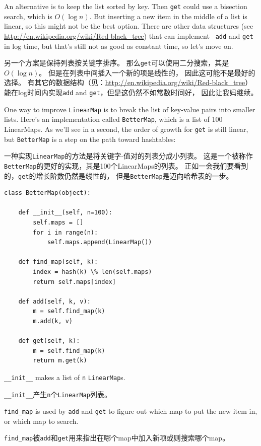 \documentclass[10pt]{book}
\begin{document}
\begin{CJK}{UTF8}{gbsn}
An alternative is to keep the list sorted by key.  Then {\tt get}
could use a bisection search, which is $O(\log n)$.  But inserting a
new item in the middle of a list is linear, so this might not be the
best option.  There are other data structures (see
  \url{http://en.wikipedia.org/wiki/Red-black_tree})  that can implement {\tt
  add} and {\tt get} in log time, but that's still not as good as
constant time, so let's move on.

另一个方案是保持列表按关键字排序。
那么{\tt get}可以使用二分搜索，其是$O(\log n)$。
但是在列表中间插入一个新的项是线性的，
因此这可能不是最好的选择。
有其它的数据结构（见：\url{http://en.wikipedia.org/wiki/Red-black_tree}）
能在log时间内实现{\tt add} and {\tt get}，但是这仍然不如常数时间好，
因此让我妈继续。

One way to improve {\tt LinearMap} is to break the list of key-value
pairs into smaller lists.  Here's an implementation called
{\tt BetterMap}, which is a list of 100 LinearMaps.  As we'll see
in a second, the order of growth for {\tt get} is still linear,
but {\tt BetterMap} is a step on the path toward hashtables:

一种实现{\tt LinearMap}的方法是将关键字-值对的列表分成小列表。
这是一个被称作{\tt BetterMap}的更好的实现，其是100个LinearMaps的列表。
正如一会我们要看到的，{\tt get}的增长阶数仍然是线性的，
但是{\tt BetterMap}是迈向哈希表的一步。

\begin{verbatim}
class BetterMap(object):

    def __init__(self, n=100):
        self.maps = []
        for i in range(n):
            self.maps.append(LinearMap())

    def find_map(self, k):
        index = hash(k) \% len(self.maps)
        return self.maps[index]

    def add(self, k, v):
        m = self.find_map(k)
        m.add(k, v)

    def get(self, k):
        m = self.find_map(k)
        return m.get(k)
\end{verbatim}

\verb"__init__" makes a list of {\tt n} {\tt LinearMap}s.

\verb"__init__"产生{\tt n}个{\tt LinearMap}列表。

\verb"find_map" is used by
{\tt add} and {\tt get}
to figure out which map to put the
new item in, or which map to search.

\verb"find_map"被{\tt add}和{\tt get}用来指出在哪个map中加入新项或则搜索哪个map。


\end{CJK}
\end{document}
